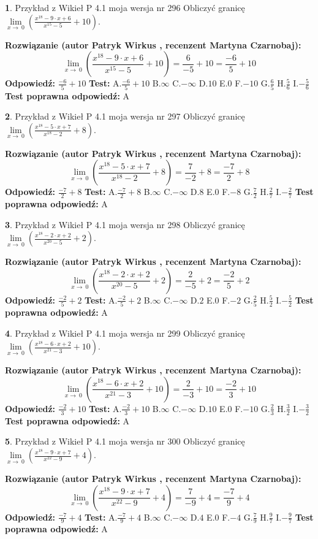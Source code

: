 \documentclass[12pt, a4paper]{article}
\theoremstyle{definition} %
\newtheorem{zad}{}
\newcommand{\zadStart}[1]{\begin{zad}#1\newline}
\newcommand{\zadStop}{\end{zad}}
\newcommand{\rozwStart}[2]{\noindent \textbf{Rozwiązanie (autor #1 , recenzent #2): }\newline}
\newcommand{\rozwStop}{\newline}
\newcommand{\odpStart}{\noindent \textbf{Odpowiedź:}\newline}
\newcommand{\odpStop}{\newline}
\newcommand{\testStart}{\noindent \textbf{Test:}\newline}
\newcommand{\testStop}{\newline}
\newcommand{\kluczStart}{\noindent \textbf{Test poprawna odpowiedź:}\newline}
\newcommand{\kluczStop}{\newline}
\begin{document}
\zadStart{Przykład z Wikieł P 4.1 moja wersja nr 296}
Obliczyć granicę $\lim\limits_{x\to\ 0}(\frac{x^{18}-9 \cdot x +6}{x^{15}-5}+10)$.
\zadStop
\rozwStart{Patryk Wirkus}{Martyna Czarnobaj}
$$\lim\limits_{x\to\ 0}(\frac{x^{18}-9 \cdot x +6}{x^{15}-5}+10)=\frac{6}{-5}+10=\frac{-6}{5}+10$$
\rozwStop
\odpStart
$\frac{-6}{5}+10$
\odpStop
\testStart
A.$\frac{-6}{5}+10$
B.$\infty$
C.$-\infty$
D.$10$
E.$0$
F.$-10$
G.$\frac{6}{5}$
H.$\frac{5}{6}$
I.$-\frac{5}{6}$
\testStop
\kluczStart
A
\kluczStop



\zadStart{Przykład z Wikieł P 4.1 moja wersja nr 297}
Obliczyć granicę $\lim\limits_{x\to\ 0}(\frac{x^{18}-5 \cdot x +7}{x^{18}-2}+8)$.
\zadStop
\rozwStart{Patryk Wirkus}{Martyna Czarnobaj}
$$\lim\limits_{x\to\ 0}(\frac{x^{18}-5 \cdot x +7}{x^{18}-2}+8)=\frac{7}{-2}+8=\frac{-7}{2}+8$$
\rozwStop
\odpStart
$\frac{-7}{2}+8$
\odpStop
\testStart
A.$\frac{-7}{2}+8$
B.$\infty$
C.$-\infty$
D.$8$
E.$0$
F.$-8$
G.$\frac{7}{2}$
H.$\frac{2}{7}$
I.$-\frac{2}{7}$
\testStop
\kluczStart
A
\kluczStop



\zadStart{Przykład z Wikieł P 4.1 moja wersja nr 298}
Obliczyć granicę $\lim\limits_{x\to\ 0}(\frac{x^{18}-2 \cdot x +2}{x^{20}-5}+2)$.
\zadStop
\rozwStart{Patryk Wirkus}{Martyna Czarnobaj}
$$\lim\limits_{x\to\ 0}(\frac{x^{18}-2 \cdot x +2}{x^{20}-5}+2)=\frac{2}{-5}+2=\frac{-2}{5}+2$$
\rozwStop
\odpStart
$\frac{-2}{5}+2$
\odpStop
\testStart
A.$\frac{-2}{5}+2$
B.$\infty$
C.$-\infty$
D.$2$
E.$0$
F.$-2$
G.$\frac{2}{5}$
H.$\frac{5}{2}$
I.$-\frac{5}{2}$
\testStop
\kluczStart
A
\kluczStop



\zadStart{Przykład z Wikieł P 4.1 moja wersja nr 299}
Obliczyć granicę $\lim\limits_{x\to\ 0}(\frac{x^{18}-6 \cdot x +2}{x^{21}-3}+10)$.
\zadStop
\rozwStart{Patryk Wirkus}{Martyna Czarnobaj}
$$\lim\limits_{x\to\ 0}(\frac{x^{18}-6 \cdot x +2}{x^{21}-3}+10)=\frac{2}{-3}+10=\frac{-2}{3}+10$$
\rozwStop
\odpStart
$\frac{-2}{3}+10$
\odpStop
\testStart
A.$\frac{-2}{3}+10$
B.$\infty$
C.$-\infty$
D.$10$
E.$0$
F.$-10$
G.$\frac{2}{3}$
H.$\frac{3}{2}$
I.$-\frac{3}{2}$
\testStop
\kluczStart
A
\kluczStop



\zadStart{Przykład z Wikieł P 4.1 moja wersja nr 300}
Obliczyć granicę $\lim\limits_{x\to\ 0}(\frac{x^{18}-9 \cdot x +7}{x^{22}-9}+4)$.
\zadStop
\rozwStart{Patryk Wirkus}{Martyna Czarnobaj}
$$\lim\limits_{x\to\ 0}(\frac{x^{18}-9 \cdot x +7}{x^{22}-9}+4)=\frac{7}{-9}+4=\frac{-7}{9}+4$$
\rozwStop
\odpStart
$\frac{-7}{9}+4$
\odpStop
\testStart
A.$\frac{-7}{9}+4$
B.$\infty$
C.$-\infty$
D.$4$
E.$0$
F.$-4$
G.$\frac{7}{9}$
H.$\frac{9}{7}$
I.$-\frac{9}{7}$
\testStop
\kluczStart
A
\kluczStop
\end{document}
